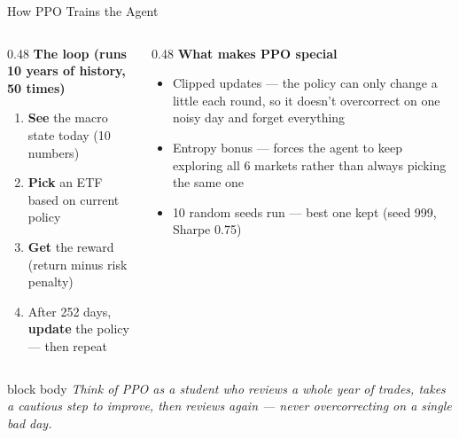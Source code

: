 \documentclass[aspectratio=169,11pt]{beamer}
\begin{document}
\begin{frame}{How PPO Trains the Agent}
  \vspace{0.2em}
  \begin{columns}[T]
    \begin{column}{0.48\textwidth}
      \textbf{The loop (runs 10 years of history, 50 times)}\\[0.7em]
      \begin{enumerate}\normalsize
        \setlength\itemsep{0.7em}
        \item \textbf{See} the macro state today (10 numbers)
        \item \textbf{Pick} an ETF based on current policy
        \item \textbf{Get} the reward (return minus risk penalty)
        \item After 252 days, \textbf{update} the policy --- then repeat
      \end{enumerate}
    \end{column}
    \begin{column}{0.48\textwidth}
      \textbf{What makes PPO special}\\[0.7em]
      \begin{itemize}\normalsize
        \setlength\itemsep{0.7em}
        \item \alert{Clipped updates} --- the policy can only change a little each round, so it doesn't overcorrect on one noisy day and forget everything
        \item \alert{Entropy bonus} --- forces the agent to keep exploring all 6 markets rather than always picking the same one
        \item \alert{10 random seeds run} --- best one kept (seed 999, Sharpe 0.75)
      \end{itemize}
    \end{column}
  \end{columns}
  \vspace{1em}
  \begin{center}
    \begin{beamercolorbox}[wd=0.85\textwidth,center,sep=0.4em]{block body}
      \normalsize\textit{Think of PPO as a student who reviews a whole year of trades, takes a cautious step to improve, then reviews again --- never overcorrecting on a single bad day.}
    \end{beamercolorbox}
  \end{center}
\end{frame}

\end{document}
